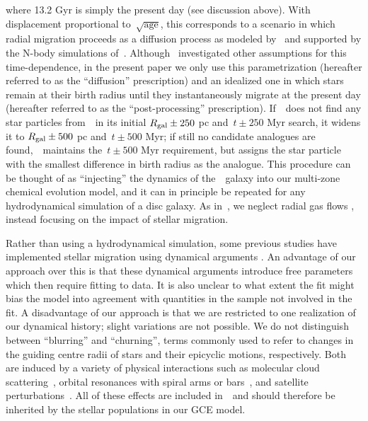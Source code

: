 where 13.2 Gyr is simply the present day (see discussion above).
With displacement proportional to~$\sqrt{\text{age}}$, this corresponds to a
scenario in which radial migration proceeds as a diffusion process as modeled
by~\citet{Frankel2018, Frankel2019} and supported by the N-body simulations
of~\citet*{Brunetti2011}.
Although~\citet{Johnson2021} investigated other assumptions for this
time-dependence, in the present paper we only use this parametrization
(hereafter referred to as the ``diffusion'' prescription) and an idealized one
in which stars remain at their birth radius until they instantaneously migrate
at the present day (hereafter referred to as the ``post-processing''
prescription).
If~\vice~does not find any star particles from~\hsim~in its initial
$R_\text{gal} \pm 250$ pc and~$t \pm 250$ Myr search, it widens it to
$R_\text{gal} \pm 500$ pc and~$t \pm 500$ Myr; if still no candidate analogues are
found,~\vice~maintains the~$t \pm 500$ Myr requirement, but assigns the star
particle with the smallest difference in birth radius as the analogue.
This procedure can be thought of as ``injecting'' the dynamics of
the~\hsim~galaxy into our multi-zone chemical evolution model, and it can in
principle be repeated for any hydrodynamical simulation of a disc galaxy.
As in~\citet{Johnson2021}, we neglect radial gas flows
\citep[e.g.][]{Lacey1985, Bilitewski2012, Vincenzo2020}, instead focusing on
the impact of stellar migration.
\par
Rather than using a hydrodynamical simulation, some previous studies have
implemented stellar migration using dynamical arguments
\citep[e.g.][]{Schoenrich2009a, Sharma2021}.
An advantage of our approach over this is that these dynamical arguments
introduce free parameters which then require fitting to data.
It is also unclear to what extent the fit might bias the model into agreement
with quantities in the sample not involved in the fit.
A disadvantage of our approach is that we are restricted to one realization of
our dynamical history; slight variations are not possible.
We do not distinguish between ``blurring'' and ``churning'', terms commonly
used to refer to changes in the guiding centre radii of stars and their
epicyclic motions, respectively.
Both are induced by a variety of physical interactions such as molecular cloud
scattering~\citep{Mihalas1981, Jenkins1990, Jenkins1992}, orbital resonances
with spiral arms or bars~\citep{Sellwood2002, Minchev2011}, and satellite
perturbations~\citep*{Bird2012}.
All of these effects are included in~\hsim~and should therefore be inherited by
the stellar populations in our GCE model.
